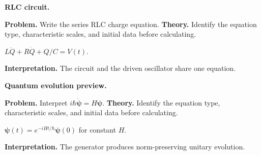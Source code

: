 \begin{workedexample}
\textbf{RLC circuit.}\par
\textbf{Problem.} Write the series RLC charge equation.
\textbf{Theory.} Identify the equation type, characteristic scales, and initial data before calculating.
\begin{solution}
$L\ddot Q+R\dot Q+Q/C=V(t)$.

\textbf{Interpretation.} The circuit and the driven oscillator share one equation.
\end{solution}
\end{workedexample}

\begin{workedexample}
\textbf{Quantum evolution preview.}\par
\textbf{Problem.} Interpret $i\hbar\dot{\boldsymbol\psi}=H\boldsymbol\psi$.
\textbf{Theory.} Identify the equation type, characteristic scales, and initial data before calculating.
\begin{solution}
$\boldsymbol\psi(t)=e^{-iHt/\hbar}\boldsymbol\psi(0)$ for constant $H$.

\textbf{Interpretation.} The generator produces norm-preserving unitary evolution.
\end{solution}
\end{workedexample}
